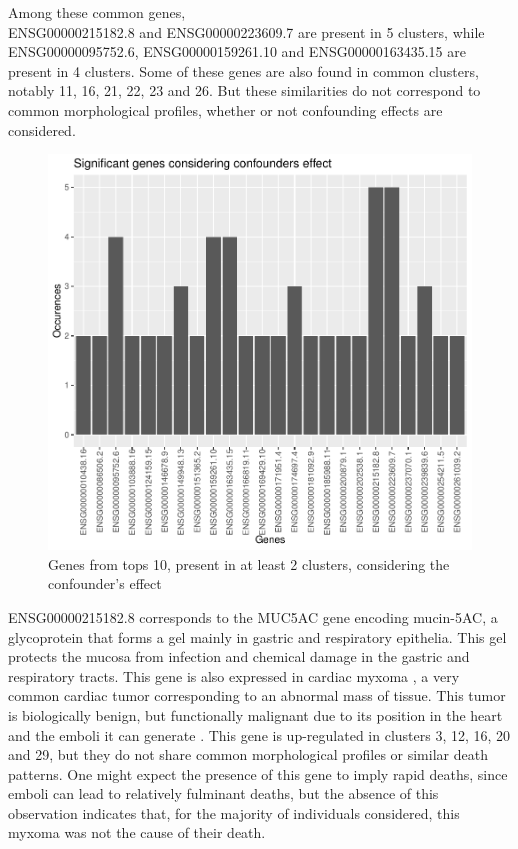 \documentclass[a4paper, 11pt]{article}
\begin{document}
\begin{multicols}{2}
Among these common genes,\\
ENSG00000215182.8 and ENSG00000223609.7 are present in 5 clusters, while ENSG00000095752.6, ENSG00000159261.10 and ENSG00000163435.15 are present in 4 clusters. Some of these genes are also found in common clusters, notably 11, 16, 21, 22, 23 and 26. But these similarities do not correspond to common morphological profiles, whether or not confounding effects are considered. 
\begin{figure}[H]
	\centering
	\includegraphics[width=\columnwidth]{figures/final_analysis/SigGenesConsideringConf}
	\caption{Genes from tops 10, present in at least 2 clusters, considering the confounder's effect}
	\label{fig:genesOcc}
\end{figure}
ENSG00000215182.8 corresponds to the MUC5AC gene encoding mucin-5AC, a glycoprotein that forms a gel mainly in gastric and respiratory epithelia. This gel protects the mucosa from infection and chemical damage in the gastric and respiratory tracts. This gene is also expressed in cardiac myxoma \citep{Islam2022}, a very common cardiac tumor corresponding to an abnormal mass of tissue. This tumor is biologically benign, but functionally malignant due to its position in the heart and the emboli it can generate  \citep{Chu2004}. This gene is up-regulated in clusters 3, 12, 16, 20 and 29, but they do not share common morphological profiles or similar death patterns. One might expect the presence of this gene to imply rapid deaths, since emboli can lead to relatively fulminant deaths, but the absence of this observation indicates that, for the majority of individuals considered, this myxoma was not the cause of their death. 


\end{multicols}
\end{document}
